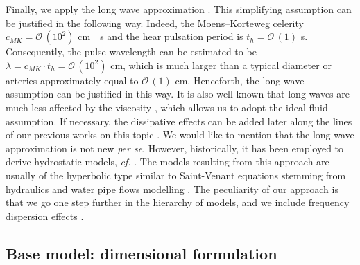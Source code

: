 \documentclass[alpha-refs, 12pt]{wiley-article}
\renewcommand{\O}{\mathcal{O}}
\begin{document}
Finally, we apply the long wave approximation \cite{Dutykh2007, Khakimzyanov2019}. This simplifying assumption can be justified in the following way. Indeed, the Moens--Korteweg celerity $c_{MK} = \O\,(10^2)$ \si{cm \per s} \cite{Tijsseling2012, Lagree2000} and the hear pulsation period is $t_{h} = \O\,(1)$ \si{s}. Consequently, the pulse wavelength can be estimated to be $\lambda = c_{MK}\cdot t_{h} = \O\,(10^2)$ \si{cm}, which is much larger than a typical diameter or arteries approximately equal to $\O\,(1)$ \si{cm}. Henceforth, the long wave assumption can be justified in this way. It is also well-known that long waves are much less affected by the viscosity \cite{Boussinesq1895, Lamb1932, Dutykh2007}, which allows us to adopt the ideal fluid assumption. If necessary, the dissipative effects can be added later along the lines of our previous works on this topic \cite{DutykhDias2007, Dutykh2008a, Dutykh2009c, Mitsotakis2019}. We would like to mention that the long wave approximation is not new \emph{per se}. However, historically, it has been employed to derive hydrostatic models, \emph{cf.} \cite{Lambert1958, Formaggia2003, Quarteroni2004, Delestre2013}. The models resulting from this approach are usually of the hyperbolic type similar to Saint-Venant equations stemming from hydraulics and water pipe flows modelling \cite{Bourdarias2007a, Bourdarias2007, Bourdarias2012}. The peculiarity of our approach is that we go one step further in the hierarchy of models, and we include frequency dispersion effects \cite{Khakimzyanov2016c}.

\subsection{Base model: dimensional formulation}
\end{document}
